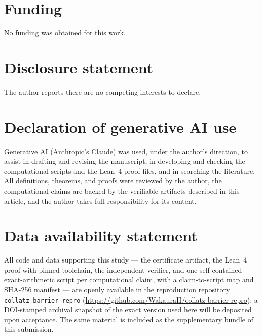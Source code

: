\documentclass[11pt]{article}
\theoremstyle{definition}
\begin{document}
\section*{Funding}

No funding was obtained for this work.

\section*{Disclosure statement}

The author reports there are no competing interests to declare.

\section*{Declaration of generative AI use}

Generative AI (Anthropic's Claude) was used, under the author's direction,
to assist in drafting and revising the manuscript, in developing and
checking the computational scripts and the Lean~4 proof files, and in
searching the literature. All definitions, theorems, and proofs were
reviewed by the author, the computational claims are backed by the
verifiable artifacts described in this article, and the author takes full
responsibility for its content.

\section*{Data availability statement}
All code and data supporting this study --- the certificate artifact, the
Lean~4 proof with pinned toolchain, the independent verifier, and one
self-contained exact-arithmetic script per computational claim, with a
claim-to-script map and SHA-256 manifest --- are openly available in the
reproduction repository \texttt{collatz-barrier-repro}
(\url{https://github.com/WakauraH/collatz-barrier-repro}); a
DOI-stamped archival snapshot of the exact version used here will be
deposited upon acceptance. The same material is included as the
supplementary bundle of this submission.
 
\end{document}
